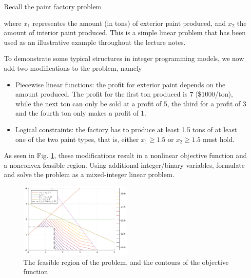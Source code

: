 Recall the paint factory problem 
%
%
where $x_1$ representes the amount (in tons) of exterior paint produced, and $x_2$ the amount of interior paint produced. This is a simple linear problem that has been used as an illustrative example throughout the lecture notes. 

To demonstrate some typical structures in integer programming models, we now add two modifications to the problem, namely
%
\begin{itemize}
    \item Piecewise linear functions: the profit for exterior paint depends on the amount produced. The profit for the first ton produced is 7 (\$1000/ton), while the next ton can only be sold at a profit of 5, the third for a profit of 3 and the fourth ton only makes a profit of 1. 
    \item Logical constraints: the factory has to produce at least 1.5 tons of at least one of the two paint types, that is, either $x_1 \ge 1.5$ or $x_2 \ge 1.5$ must hold.
\end{itemize}

As seen in Fig. \ref{p1c8:fig:E86-plot}, these modifications result in a nonlinear objective function and a nonconvex feasible region. Using additional integer/binary variables, formulate and solve the problem as a mixed-integer linear problem.

\begin{figure}[h]
	\centering
	\includegraphics[width=0.5\textwidth]{chapters/chapter_8/figures/E86-plot.pdf}
	\caption{The feasible region of the problem, and the contours of the objective function} 
    \label{p1c8:fig:E86-plot}
\end{figure}